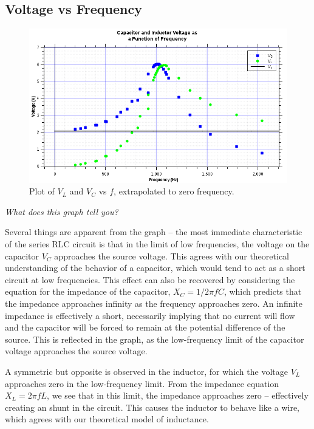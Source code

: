\documentclass[twocolumn,english]{IEEEtran}
\theoremstyle{plain}
\theoremstyle{plain}
\begin{document}
\hrulefill

\subsection{Voltage vs Frequency}

\begin{figure}[h!]
	\begin{centering}
	\begin{center}
	\includegraphics[width=\linewidth]{./Images/Part6.png}
	\caption{Plot of $V_L$ and $V_C$ vs $f$, extrapolated to zero frequency.}
	\label{fig:VvsFreq}
	\end{center}
	\par\end{centering}
\end{figure}

\textit{What does this graph tell you?}

Several things are apparent from the graph -- the most immediate characteristic of the series RLC circuit is that in the limit of low frequencies, the voltage on the capacitor $V_C$ approaches the source voltage. This agrees with our theoretical understanding of the behavior of a capacitor, which would tend to act as a short circuit at low frequencies. This effect can also be recovered by considering the equation for the impedance of the capacitor, $X_C = 1/2\pi f C$, which predicts that the impedance approaches infinity as the frequency approaches zero. An infinite impedance is effectively a short, necessarily implying that no current will flow and the capacitor will be forced to remain at the potential difference of the source. This is reflected in the graph, as the low-frequency limit of the capacitor voltage approaches the source voltage.

A symmetric but opposite is observed in the inductor, for which the voltage $V_L$ approaches zero in the low-frequency limit. From the impedance equation $X_L = 2\pi f L$, we see that in this limit, the impedance approaches zero -- effectively creating an shunt in the circuit. This causes the inductor to behave like a wire, which agrees with our theoretical model of inductance.
\end{document}
